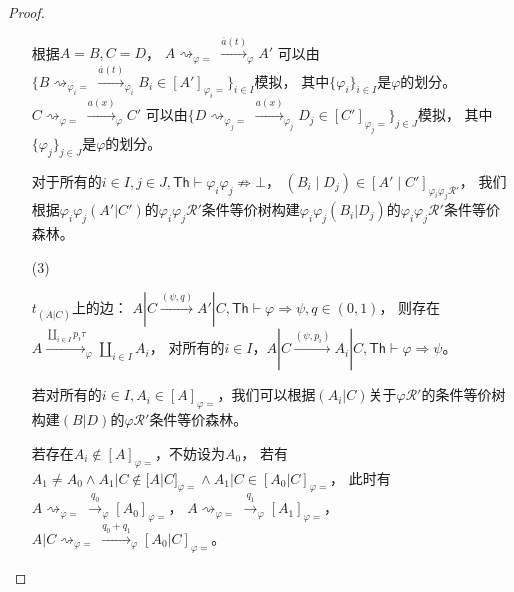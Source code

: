 \begin{proof}
\begin{itemize}
{         根据$A=B,C=D$，
         $A\rightsquigarrow_{\varphi = }\stackrel{\overline{a}(t)}{\longrightarrow}_{\varphi}A'$
         可以由$\{B\rightsquigarrow_{\varphi_i =}\stackrel{\overline{a}(t)}{\longrightarrow}_{\varphi_i}B_i\in [A']_{\varphi_i=}\}_{i\in I}$模拟，
         其中$\{\varphi_i\}_{i\in I}$是$\varphi$的划分。
         $C\rightsquigarrow_{\varphi = }\stackrel{a(x)}{\longrightarrow}_{\varphi}C'$
         可以由$\{D\rightsquigarrow_{\varphi_j =}\stackrel{a(x)}{\longrightarrow}_{\varphi_j}D_j\in [C']_{\varphi_j=}\}_{j\in J}$模拟，
         其中$\{\varphi_j\}_{j\in J}$是$\varphi$的划分。

         对于所有的$i\in I, j\in J, \mathsf{Th}\vdash \varphi_i\varphi_j\not\Rightarrow \bot$，
         $(B_i\mid D_j)\in[A'\mid C']_{\varphi_i\varphi_j \mathcal{R'}}$，
         我们根据$\varphi_i\varphi_j(A'|C')$的$\varphi_i\varphi_j \mathcal{R}' $条件等价树构建$\varphi_i\varphi_j(B_i|D_j)$的$\varphi_i\varphi_j \mathcal{R}' $条件等价森林。
      }
      \item[(3)] {
         $t_{(A|C)}$上的边：
         $A|C\stackrel{(\psi, q)}{\rightarrow} A'|C, \mathsf{Th}\vdash \varphi\Rightarrow\psi, q\in(0,1)$，
         则存在$A\stackrel{\coprod_{i\in I}p_i\tau}{\longrightarrow}_{\varphi} \coprod_{i\in I} A_i$，
         对所有的$i\in I$，$A|C\stackrel{(\psi, p_i)}{\rightarrow} A_i|C, \mathsf{Th}\vdash \varphi\Rightarrow\psi$。

         若对所有的$i\in I, A_i\in[A]_{\varphi =}$，我们可以根据$(A_i|C)$关于$\varphi\mathcal{R}'$的条件等价树构建$(B|D)$的$\varphi\mathcal{R}'$条件等价森林。

         若存在$A_i\notin [A]_{\varphi =}$，不妨设为$A_0$，
         若有$A_1\neq A_0 \wedge A_1|C\notin[A|C]_{\varphi =}\wedge A_1|C\in [A_0|C]_{\varphi =}$，
         此时有$A\rightsquigarrow_{\varphi = }\stackrel{q_0}{\rightarrow}_{\varphi}[A_0]_{\varphi=}$，
         $A\rightsquigarrow_{\varphi = }\stackrel{q_1}{\rightarrow}_{\varphi}[A_1]_{\varphi=}$，
         $A|C\rightsquigarrow_{\varphi = }\stackrel{q_0+q_1}{\longrightarrow}_{\varphi}[A_0|C]_{\varphi=}$。

}
\end{itemize}
\end{proof}
